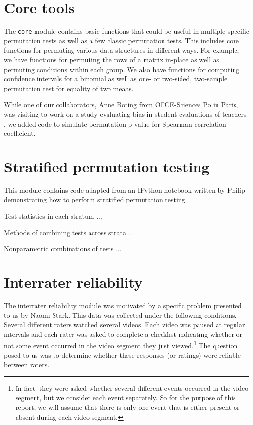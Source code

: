 \section{Core tools}

The \texttt{core} module contains basic functions that could be useful in
multiple specific permutation tests as well as a few classic permutation tests.
This includes core functions for permuting various data structures in different
ways.  For example, we have functions for permuting the rows of a matrix
in-place as well as permuting conditions within each group. We also have
functions for computing confidence intervals for a binomial as well as
one- or two-sided, two-sample permutation test for equality of two means.

While one of our collaborators, Anne Boring from OFCE-Sciences Po in Paris, was
visiting to work on a study evaluating bias in student evaluations of teachers
\cite{boring2015}, we added code to simulate permutation p-value for Spearman
correlation coefficient.

\section{Stratified permutation testing}

This module contains code adapted from an IPython notebook written by
Philip demonstrating how to perform stratified permutation testing.

Test statistics in each stratum ...

Methods of combining tests across strata ...

Nonparametric combinations of tests ...

\section{\label{sec:irr}Interrater reliability}

The interrater reliability module was motivated by a specific problem presented
to us by Naomi Stark.  This data was collected under the following conditions.
Several different raters watched several videos.  Each video was paused at
regular intervals and each rater was asked to complete a checklist indicating
whether or not some event occurred in the video segment they just
viewed.\footnote{In fact, they were asked whether several different events
occurred in the video segment, but we consider each event separately.  So for
the purpose of this report, we will assume that there is only one event that is
either present or absent during each video segment.} The question posed to us
was to determine whether these responses (or ratings) were reliable between
raters. 

